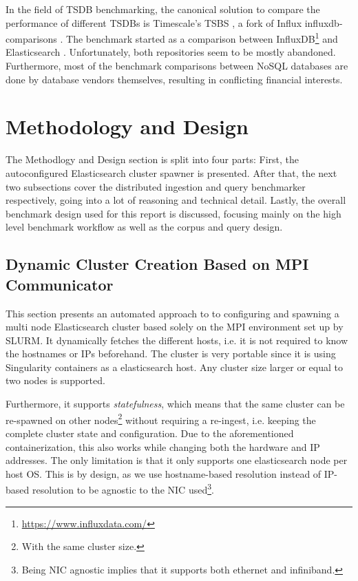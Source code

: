 In the field of \ac{TSDB} benchmarking, the canonical solution to compare the performance of different \acp{TSDB} is Timescale's \ac{TSBS} \cite{tsbs}, a fork of Influx influxdb-comparisons \cite{ifdbcomp}. The benchmark started as a comparison between InfluxDB\footnote{\url{https://www.influxdata.com/}} and Elasticsearch \cite{ifdbes}. Unfortunately, both repositories seem to be mostly abandoned.\\

Furthermore, most of the benchmark comparisons between NoSQL databases are done by database vendors themselves, resulting in conflicting financial interests.

\section{Methodology and Design}
The Methodlogy and Design section is split into four parts: First, the autoconfigured Elasticsearch cluster spawner is presented. After that, the next two subsections cover the distributed ingestion and query benchmarker respectively, going into a lot of reasoning and technical detail. Lastly, the overall benchmark design used for this report is discussed, focusing mainly on the high level benchmark workflow as well as the corpus and query design.

\subsection{Dynamic Cluster Creation Based on MPI Communicator}
This section presents an automated approach to to configuring and spawning a multi node Elasticsearch cluster based solely on the \ac{MPI} environment set up by SLURM. It dynamically fetches the different hosts, i.e. it is not required to know the hostnames or IPs beforehand. The cluster is very portable since it is using Singularity \cite{singularity} containers as a elasticsearch host. Any cluster size larger or equal to two nodes is supported.

Furthermore, it supports \emph{statefulness}, which means that the same cluster can be re-spawned on other nodes\footnote{With the same cluster size.} without requiring a re-ingest, i.e. keeping the complete cluster state and configuration. Due to the aforementioned containerization, this also works while changing both the hardware and IP addresses. The only limitation is that it only supports one elasticsearch node per host OS. This is by design, as we use hostname-based resolution instead of IP-based resolution to be agnostic to the \ac{NIC} used\footnote{Being \ac{NIC} agnostic implies that it supports both ethernet and infiniband.}. 

